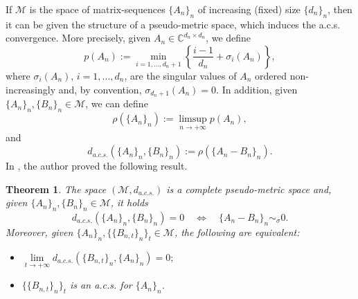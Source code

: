 \documentclass{amsart}
\newtheorem{thm}{Theorem}[section]
\begin{document}
If $\mathcal{M}$ is the space of matrix-sequences $\{A_n\}_n$ of increasing (fixed) size $\{d_n\}_n$, then it can be given the structure of a pseudo-metric space, which induces the a.c.s. convergence. More precisely, given $A_n\in\mathbb{C}^{d_n\times d_n}$, we define
\begin{equation*}
    p(A_n):=\min\limits_{i=1,\ldots,d_n+1}\left\{\frac{i-1}{d_n}+\sigma_i(A_n)\right\},
\end{equation*}
where $\sigma_i(A_n)$, $i=1,\dots,d_n$, are the singular values of $A_n$ ordered non-increasingly and, by convention, $\sigma_{d_n+1}(A_n)=0$. In addition, given $\{A_n\}_n,\{B_n\}_n\in\mathcal{M}$, we can define
\begin{equation*}
    \rho(\{A_n\}_n):=\limsup_{n\to+\infty}p(A_n),
\end{equation*}
and 
\begin{equation*}
    d_{a.c.s.}(\{A_n\}_n,\{B_n\}_n):=\rho(\{A_n-B_n\}_n).
\end{equation*}
In \cite{Barb17}, the author proved the following result.
\begin{thm}\label{completeness_acs_conv}
    The space $(\mathcal{M},d_{a.c.s.})$ is a complete pseudo-metric space and, given $\{A_n\}_n,\{B_n\}_n\in\mathcal{M}$, it holds
    \begin{equation*}
        d_{a.c.s.}(\{A_n\}_n,\{B_n\}_n)=0\quad\iff\quad\{A_n-B_n\}_n\sim_{\sigma} 0.
    \end{equation*}
    Moreover, given $\{A_n\}_n,\{\{B_{n,t}\}_n\}_t\in\mathcal{M}$, the following are equivalent:
    \begin{itemize}
        \item $\lim\limits_{t\to+\infty} d_{a.c.s.}(\{B_{n,t}\}_n,\{A_n\}_n)=0;$
        \item $\{\{B_{n,t}\}_n\}_t$ is an a.c.s. for $\{A_n\}_n$.
    \end{itemize}
\end{thm}
\end{document}
